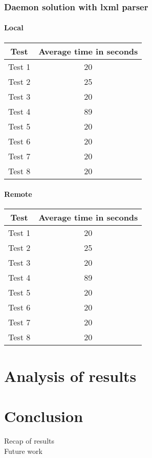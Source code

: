 \subsection{Daemon solution with lxml parser}
\subsubsection{Local}
\begin{center}
    \begin{tabular}{| c | c |}
    \hline
    Test & Average time in seconds \\ \hline
    Test 1 & 20 \\ \hline
    Test 2 & 25 \\ \hline
    Test 3 & 20 \\ \hline
    Test 4 & 89 \\ \hline
    Test 5 & 20 \\ \hline
    Test 6 & 20 \\ \hline
    Test 7 & 20 \\ \hline
    Test 8 & 20 \\ \hline
    \end{tabular}
\end{center}
\subsubsection{Remote}
\begin{center}
    \begin{tabular}{| c | c |}
    \hline
    Test & Average time in seconds \\ \hline
    Test 1 & 20 \\ \hline
    Test 2 & 25 \\ \hline
    Test 3 & 20 \\ \hline
    Test 4 & 89 \\ \hline
    Test 5 & 20 \\ \hline
    Test 6 & 20 \\ \hline
    Test 7 & 20 \\ \hline
    Test 8 & 20 \\ \hline
    \end{tabular}
\end{center}

\chapter{Analysis of results}
\label{results}

\chapter{Conclusion}
\label{conclusion}
Recap of results
\\
Future work


